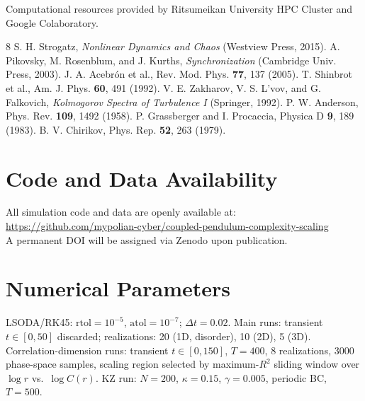 \documentclass[aps,pre,12pt]{revtex4-2}
\begin{document}
\begin{acknowledgments}
Computational resources provided by Ritsumeikan University HPC Cluster and Google Colaboratory.
\end{acknowledgments}

\begin{thebibliography}{8}
 S. H. Strogatz, \textit{Nonlinear Dynamics and Chaos} (Westview Press, 2015).
 A. Pikovsky, M. Rosenblum, and J. Kurths, \textit{Synchronization} (Cambridge Univ. Press, 2003).
 J. A. Acebr\'on et al., Rev. Mod. Phys. \textbf{77}, 137 (2005).
 T. Shinbrot et al., Am. J. Phys. \textbf{60}, 491 (1992).
 V. E. Zakharov, V. S. L'vov, and G. Falkovich, \textit{Kolmogorov Spectra of Turbulence I} (Springer, 1992).
 P. W. Anderson, Phys. Rev. \textbf{109}, 1492 (1958).
 P. Grassberger and I. Procaccia, Physica D \textbf{9}, 189 (1983).
 B. V. Chirikov, Phys. Rep. \textbf{52}, 263 (1979).
\end{thebibliography}

\appendix

\section{Code and Data Availability}
All simulation code and data are openly available at:\\
\url{https://github.com/mypolian-cyber/coupled-pendulum-complexity-scaling}\\
A permanent DOI will be assigned via Zenodo upon publication.

\section{Numerical Parameters}
LSODA/RK45: $\text{rtol}=10^{-5}$, $\text{atol}=10^{-7}$; $\Delta t=0.02$. Main runs: transient $t\in[0,50]$ discarded; realizations: 20 (1D, disorder), 10 (2D), 5 (3D). Correlation-dimension runs: transient $t\in[0,150]$, $T=400$, 8 realizations, 3000 phase-space samples, scaling region selected by maximum-$R^2$ sliding window over $\log r$ vs.\ $\log C(r)$. KZ run: $N=200$, $\kappa=0.15$, $\gamma=0.005$, periodic BC, $T=500$.
\end{document}
